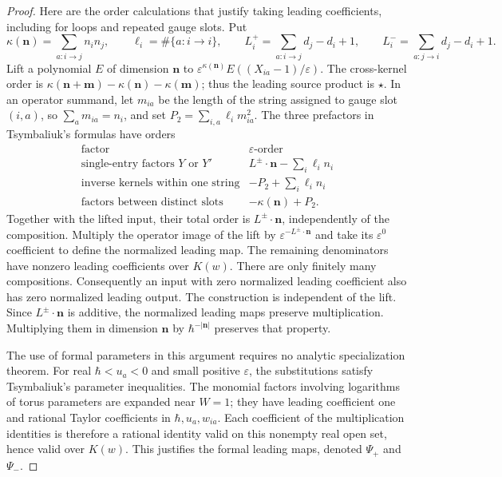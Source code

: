 \begin{proof}
Here are the order calculations that justify taking leading coefficients,
including for loops and repeated gauge slots.
Put
\[
 \kappa(\mathbf n)=\sum_{a:i\to j}n_in_j,\qquad
 \ell_i=\#\{a:i\to i\},\qquad
 L_i^+=\sum_{a:i\to j}d_j-d_i+1,\qquad
 L_i^-=\sum_{a:j\to i}d_j-d_i+1.
\]
Lift a polynomial \(E\) of dimension \(\mathbf n\) to
\(\varepsilon^{\kappa(\mathbf n)}
 E((X_{ia}-1)/\varepsilon)\).
The cross-kernel order is
\(\kappa(\mathbf n+\mathbf m)-\kappa(\mathbf n)-\kappa(\mathbf m)\);
thus the leading source product is \(\star\).
In an operator summand, let \(m_{ia}\) be the length of the string
assigned to gauge slot \((i,a)\), so \(\sum_a m_{ia}=n_i\), and set
\(P_2=\sum_{i,a}\ell_i m_{ia}^2\).
The three prefactors in Tsymbaliuk's formulas have orders
\[
 \begin{array}{c|c}
 \text{factor}&\varepsilon\text{-order}\\ \hline
 \text{single-entry factors }Y\text{ or }Y'
     &L^\pm\cdot\mathbf n-\sum_i\ell_i n_i\\
 \text{inverse kernels within one string}
     &-P_2+\sum_i\ell_i n_i\\
 \text{factors between distinct slots}
     &-\kappa(\mathbf n)+P_2 .
 \end{array}
\]
Together with the lifted input, their total order is
\(L^\pm\cdot\mathbf n\), independently of the composition.
Multiply the operator image of the lift by
\(\varepsilon^{-L^\pm\cdot\mathbf n}\) and take its
\(\varepsilon^0\) coefficient to define the normalized leading map.
The remaining denominators have nonzero leading coefficients over
\(K(w)\).  There are only finitely many compositions.  Consequently
an input with zero normalized leading coefficient also has zero
normalized leading output.  The construction is independent of the lift.
Since \(L^\pm\cdot\mathbf n\) is additive, the normalized leading
maps preserve multiplication.  Multiplying them in dimension
\(\mathbf n\) by \(\hbar^{-|\mathbf n|}\) preserves that property.

The use of formal parameters in this argument requires no analytic
specialization theorem.  For real
\(\hbar<u_a<0\) and small positive \(\varepsilon\), the substitutions
satisfy Tsymbaliuk's parameter inequalities.
The monomial factors involving logarithms of torus parameters are
expanded near \(W=1\); they have leading coefficient one and rational
Taylor coefficients in \(\hbar,u_a,w_{ia}\).
Each coefficient of the multiplication identities is therefore a
rational identity valid on this nonempty real open set, hence valid
over \(K(w)\).  This justifies the formal leading maps, denoted
\(\Psi_+\) and \(\Psi_-\).


\end{proof}
